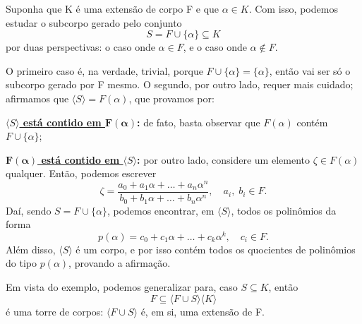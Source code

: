\documentclass[../algebraIII_notes.tex]{subfiles}
\begin{document}
\begin{example}
	Suponha que K é uma extensão de corpo F e que \(\alpha \in K\). Com isso, podemos estudar o subcorpo gerado pelo conjunto
	\[
		S = F \cup \{\alpha \} \subseteq K
	\]
	por duas perspectivas: o caso onde \(\alpha \in F\), e o caso onde \(\alpha \not\in F\).

	O primeiro caso é, na verdade, trivial, porque \(F\cup \{\alpha \} = \{\alpha \}\), então vai ser só o subcorpo gerado por F mesmo. O segundo, por outro lado, requer mais cuidado; afirmamos que \(\langle S \rangle=F(\alpha )\), que provamos por:

	\textbf{\underline{\(\langle S \rangle\) está contido em \(\mathbf{F(\alpha )}\)}:} de fato, basta observar que \(F(\alpha )\) contém \(F\cup \{\alpha \}\);

	\textbf{\underline{\(\mathbf{F(\alpha )}\) está contido em \(\langle S \rangle\)}:} por outro lado, considere um elemento \(\zeta \in F(\alpha )\) qualquer. Então, podemos escrever
	\[
		\zeta = \frac{a_{0}+ a_1 \alpha +\dotsc +a_{n}\alpha^{n}}{b_{0}+b_1\alpha +\dotsc +b_{n}\alpha^{n}},\quad a_{i},\; b_{i}\in F.
	\]
	Daí, sendo \(S=F\cup \{\alpha \}\), podemos encontrar, em \(\langle S \rangle\), todos os polinômios da forma
	\[
		p(\alpha )=c_{0}+c_1\alpha +\dotsc +c_{k}\alpha^{k}, \quad c_{i}\in F.
	\]
	Além disso, \(\langle S \rangle\) é um corpo, e por isso contém todos os quocientes de polinômios do tipo \(p(\alpha )\), provando a afirmação.
\end{example}
Em vista do exemplo, podemos generalizar para, caso \(S\subseteq K\), então
\[
	F\subseteq \langle F\cup S \rangle\langle K \rangle
\]
é uma torre de corpos: \(\langle F\cup S \rangle\) é, em si, uma extensão de F.
\end{document}
